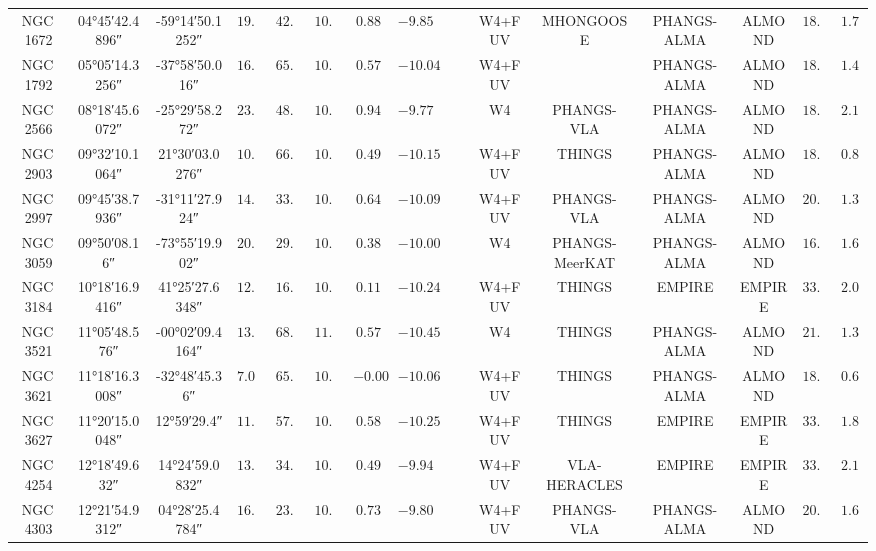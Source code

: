 \documentclass[letter, longauth]{aa} %
\newcommand*{\ra}[2][]{{
                \ang[
                angle-symbol-degree=\textsuperscript{h},
                angle-symbol-minute=\textsuperscript{m},
                angle-symbol-second=\textsuperscript{s},
                #1]{#2}%
}}
\newcommand{\cmark}{\textcolor{green}{\ding{51}}}
\newcommand{\xmark}{\textcolor{red}{\ding{55}}}
\begin{document}
\begin{appendix}
\begin{table}
\begin{center}
{\begin{tabular}{cccccccccccccccc}
NGC\,1672 & \ra{04;45;42.4896} & \ang{-59;14;50.1252} & $19.40$ & $42.60$ & $10.73$ & $0.88$ & $-9.85$ & \cmark & \cmark & W4+FUV & MHONGOOSE & PHANGS-ALMA & ALMOND & $18.20$ & $1.71$ \\
NGC\,1792 & \ra{05;05;14.3256} & \ang{-37;58;50.016} & $16.20$ & $65.10$ & $10.61$ & $0.57$ & $-10.04$ & \xmark & \xmark & W4+FUV & \xmark & PHANGS-ALMA & ALMOND & $18.70$ & $1.47$ \\
NGC\,2566 & \ra{08;18;45.6072} & \ang{-25;29;58.272} & $23.44$ & $48.50$ & $10.71$ & $0.94$ & $-9.77$ & \cmark & \xmark & W4 & PHANGS-VLA & PHANGS-ALMA & ALMOND & $18.50$ & $2.10$ \\
NGC\,2903 & \ra{09;32;10.1064} & \ang{+21;30;03.0276} & $10.00$ & $66.80$ & $10.63$ & $0.49$ & $-10.15$ & \cmark & \xmark & W4+FUV & THINGS & PHANGS-ALMA & ALMOND & $18.30$ & $0.89$ \\
NGC\,2997 & \ra{09;45;38.7936} & \ang{-31;11;27.924} & $14.06$ & $33.00$ & $10.73$ & $0.64$ & $-10.09$ & \xmark & \xmark & W4+FUV & PHANGS-VLA & PHANGS-ALMA & ALMOND & $20.40$ & $1.39$ \\
NGC\,3059 & \ra{09;50;08.16} & \ang{-73;55;19.902} & $20.23$ & $29.40$ & $10.38$ & $0.38$ & $-10.00$ & \cmark & \xmark & W4 & PHANGS-MeerKAT & PHANGS-ALMA & ALMOND & $16.70$ & $1.64$ \\
NGC\,3184 & \ra{10;18;16.9416} & \ang{+41;25;27.6348} & $12.58$ & $16.00$ & $10.36$ & $0.11$ & $-10.24$ & \cmark & \cmark & W4+FUV & THINGS & EMPIRE & EMPIRE & $33.30$ & $2.03$ \\
NGC\,3521 & \ra{11;05;48.576} & \ang{-00;02;09.4164} & $13.24$ & $68.80$ & $11.02$ & $0.57$ & $-10.45$ & \xmark & \xmark & W4 & THINGS & PHANGS-ALMA & ALMOND & $21.10$ & $1.35$ \\
NGC\,3621 & \ra{11;18;16.3008} & \ang{-32;48;45.36} & $7.06$ & $65.80$ & $10.06$ & $-0.00$ & $-10.06$ & \xmark & \cmark & W4+FUV & THINGS & PHANGS-ALMA & ALMOND & $18.90$ & $0.65$ \\
NGC\,3627 & \ra{11;20;15.0048} & \ang{+12;59;29.4} & $11.32$ & $57.30$ & $10.83$ & $0.58$ & $-10.25$ & \cmark & \cmark & W4+FUV & THINGS & EMPIRE & EMPIRE & $33.30$ & $1.83$ \\
NGC\,4254 & \ra{12;18;49.632} & \ang{+14;24;59.0832} & $13.10$ & $34.40$ & $10.42$ & $0.49$ & $-9.94$ & \xmark & \xmark & W4+FUV & VLA-HERACLES & EMPIRE & EMPIRE & $33.30$ & $2.11$ \\
NGC\,4303 & \ra{12;21;54.9312} & \ang{+04;28;25.4784} & $16.99$ & $23.50$ & $10.52$ & $0.73$ & $-9.80$ & \cmark & \cmark & W4+FUV & PHANGS-VLA & PHANGS-ALMA & ALMOND & $20.20$ & $1.66$ \\

\end{tabular}}
\end{center}
\end{table}
\end{appendix}
\end{document}
